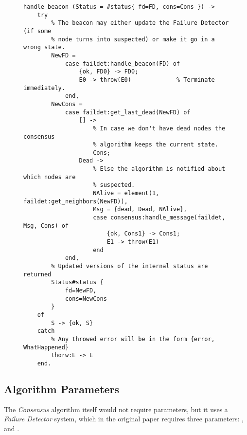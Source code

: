 \begin{itemize}
            \begin{figure}[tb!]
            \begin{lstlisting}[caption={Events from the \emph{Failure
                                        Detector}},
                               label={code:FromFaildet}]
handle_beacon (Status = #status{ fd=FD, cons=Cons }) ->
    try
        % The beacon may either update the Failure Detector (if some
        % node turns into suspected) or make it go in a wrong state.
        NewFD =
            case faildet:handle_beacon(FD) of
                {ok, FD0} -> FD0;
                E0 -> throw(E0)             % Terminate immediately.
            end,
        NewCons =
            case faildet:get_last_dead(NewFD) of
                [] ->
                    % In case we don't have dead nodes the consensus
                    % algorithm keeps the current state.
                    Cons;
                Dead ->
                    % Else the algorithm is notified about which nodes are
                    % suspected.
                    NAlive = element(1, faildet:get_neighbors(NewFD)),
                    Msg = {dead, Dead, NAlive},
                    case consensus:handle_message(faildet, Msg, Cons) of
                        {ok, Cons1} -> Cons1;
                        E1 -> throw(E1)
                    end
            end,
        % Updated versions of the internal status are returned
        Status#status {
            fd=NewFD,
            cons=NewCons
        }
    of
        S -> {ok, S}
    catch
        % Any throwed error will be in the form {error, WhatHappened}
        thorw:E -> E
    end.
            \end{lstlisting}
            \end{figure}

\end{itemize}


\subsection{Algorithm Parameters} \label{sub:ConsParams}

The \emph{Consensus} algorithm itself would not require parameters, but it
uses a \emph{Failure Detector} system, which in the original
paper\cite{bib:FD} requires three parameters: ,
 and .


